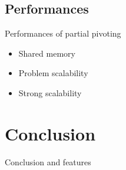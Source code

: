 \documentclass{beamer}
\begin{document}
\subsection{Performances}
\begin{frame}{Performances of partial pivoting}
\begin{itemize}
\item Shared memory
\item Problem scalability
\item Strong scalability
\end{itemize}
\end{frame}

\section*{Conclusion}
\begin{frame}{Conclusion and features}
\end{frame}
\end{document}
